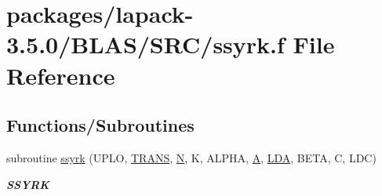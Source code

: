 \hypertarget{lapack-3_85_80_2BLAS_2SRC_2ssyrk_8f}{}\section{packages/lapack-\/3.5.0/\+B\+L\+A\+S/\+S\+R\+C/ssyrk.f File Reference}
\label{lapack-3_85_80_2BLAS_2SRC_2ssyrk_8f}
\subsection*{Functions/\+Subroutines}
\begin{DoxyCompactItemize}
\item 
subroutine \hyperlink{group__single__blas__level3_gae953a93420ca237670f5c67bbde9d9ff}{ssyrk} (U\+P\+L\+O, \hyperlink{superlu__enum__consts_8h_a0c4e17b2d5cea33f9991ccc6a6678d62a1f61e3015bfe0f0c2c3fda4c5a0cdf58}{T\+R\+A\+N\+S}, \hyperlink{polmisc_8c_a0240ac851181b84ac374872dc5434ee4}{N}, K, A\+L\+P\+H\+A, \hyperlink{classA}{A}, \hyperlink{example__user_8c_ae946da542ce0db94dced19b2ecefd1aa}{L\+D\+A}, B\+E\+T\+A, C, L\+D\+C)
\begin{DoxyCompactList}\small\item\em {\bfseries S\+S\+Y\+R\+K} \end{DoxyCompactList}\end{DoxyCompactItemize}
